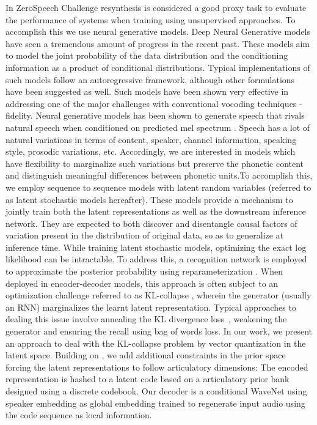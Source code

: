 In ZeroSpeech Challenge\citep{zerospeech2019} resynthesis is considered a good proxy task to evaluate the performance of systems when training using unsupervised approaches. To accomplish this we use neural generative models. %
Deep Neural Generative models have seen a tremendous amount of progress in the recent past. These models aim to model the joint probability of the data distribution and the conditioning information as a product of conditional distributions. Typical implementations of such models follow an autoregressive framework, although other formulations have been suggested as well. Such models have been shown very effective in addressing one of the major challenges with conventional vocoding techniques - fidelity. 
Neural generative models has been shown to generate speech that rivals natural speech when conditioned on predicted mel spectrum \citep{shen2017natural}. Speech has a lot of natural variations in terms of content, speaker, channel information, speaking style, prosodic variations, etc. Accordingly, we are interested in models which have flexibility to  marginalize such variations but preserve the phonetic content and distinguish meaningful differences between phonetic units.To accomplish this, we employ sequence to sequence models with latent random variables (referred to as latent stochastic models hereafter). These models provide a mechanism to jointly train both the latent representations as well as the downstream inference network. They are expected to both discover and disentangle causal factors of variation present in the distribution of original data, so as to generalize at inference time. While training latent stochastic models, optimizing the exact log likelihood can be intractable. To address this, a recognition network is employed to approximate the posterior probability using reparameterization \citep{vae}. When deployed in encoder-decoder models, this approach is often subject to an optimization challenge referred to as KL-collapse \citep{bowman_continuous}, wherein the generator (usually an RNN) marginalizes the learnt latent representation. Typical approaches to dealing this issue involve annealing the KL divergence loss~\citep{bowman_continuous,zhou2017multi}, weakening the generator \citep{zhao2017learning} and ensuring the recall using bag of words loss.  In our work, we present an approach to deal with the KL-collapse problem by vector quantization in the latent space.  Building on \citep{vq-vae, chorowski2019unsupervised}, we add additional constraints in the prior space forcing the latent representations to follow articulatory dimensions: The encoded representation is hashed to a latent code based on a articulatory prior bank designed using a discrete codebook. Our decoder is a conditional WaveNet using speaker embedding as global embedding trained to regenerate input audio using the  code sequence as local information. 


